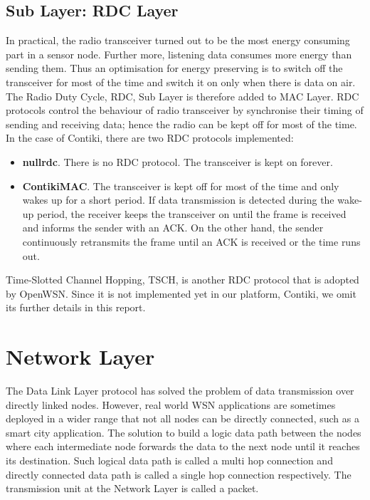 \subsection{Sub Layer: RDC Layer}
In practical, the radio transceiver turned out to be the most energy consuming part in a sensor node. Further more, listening data consumes more energy than sending them. Thus an optimisation for energy preserving is to switch off the transceiver for most of the time and switch it on only when there is data on air. The Radio Duty Cycle, RDC, Sub Layer is therefore added to MAC Layer. RDC protocols control the behaviour of radio transceiver by synchronise their timing of sending and receiving data; hence the radio can be kept off for most of the time. In the case of Contiki, there are two RDC protocols implemented:
\begin{itemize}
\item \textbf{nullrdc}. There is no RDC protocol. The transceiver is kept on forever.
\item \textbf{ContikiMAC\cite{ContikiMAC}}. The transceiver is kept off for most of the time and only wakes up for a short period. If data transmission is detected during the wake-up period, the receiver keeps the transceiver on until the frame is received and informs the sender with an ACK. On the other hand, the sender continuously retransmits the frame until an ACK is received or the time runs out.
\end{itemize}

Time-Slotted Channel Hopping\cite{TSCH}, TSCH, is another RDC protocol that is adopted by OpenWSN. Since it is not implemented yet in our platform, Contiki, we omit its further details in this report.

\section{Network Layer}
The Data Link Layer protocol has solved the problem of data transmission over directly linked nodes. However, real world WSN applications are sometimes deployed in a wider range that not all nodes can be directly connected, such as a smart city application. The solution to build a logic data path between the nodes where each intermediate node forwards the data to the next node until it reaches its destination. Such logical data path is called a multi hop connection and directly connected data path is called a single hop connection respectively. The transmission unit at the Network Layer is called a packet.


